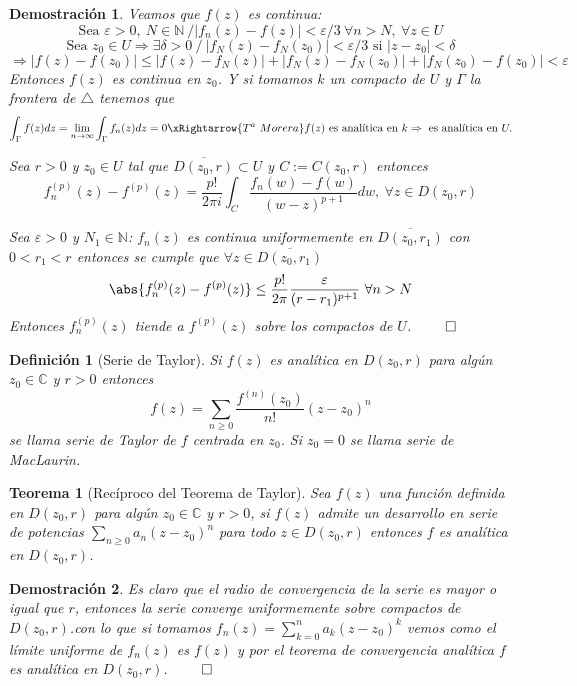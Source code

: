 \documentclass[12pt]{book}
\newtheorem{defi}{Definición}[chapter]
\newtheorem{theorem}{Teorema}[chapter]
\newtheorem*{dem}{Demostración}
\newcommand{\C}{\mathbb{C}}
\newcommand{\N}{\mathbb{N}}
\begin{document}
\begin{dem}
Veamos que $f(z)$ es continua:
$$\text{Sea } \varepsilon >0,\ N \in \N\ / |f_n(z)-f(z)| < \varepsilon/3\ \forall n> N,\ \forall z\in U$$
$$\text{Sea } z_0 \in U \Rightarrow \exists \delta >0\ /\ |f_N(z)-f_N(z_0)|<\varepsilon/3 \text{ si }|z-z_0|<\delta$$
$$ \Rightarrow |f(z)-f(z_0)| \leq |f(z)-f_N(z)|+|f_N(z)-f_N(z_0)|+|f_N(z_0)-f(z_0)|<\varepsilon$$
Entonces $f(z)$ es continua en $z_0$. Y si tomamos $k$ un compacto de $U$ y $\Gamma$ la frontera de $\triangle$ tenemos que
$$\int_\Gamma f(z)dz = \lim_{n\to \infty}\int_\Gamma f_n(z)dz = 0 \xRightarrow{T^a\ Morera} f(z) \text{ es analítica en } k\Rightarrow \text{ es analítica en } U.$$

Sea $r>0$ y $z_0\in U$ tal que $\overline{D(z_0,r)}\subset U$ y $C := C(z_0,r)$ entonces
$$f_n^{(p)}(z) - f^{(p)}(z) = \frac{p!}{2\pi i}\int_C \frac{f_n(w)-f(w)}{(w-z)^{p+1}}dw,\ \forall z\in D(z_0,r)$$

Sea $\varepsilon >0$ y $N_1 \in \N$: $f_n(z)$ es continua uniformemente en $\overline{D(z_0,r_1)}$ con $0<r_1<r$ entonces  se cumple que $\forall z \in\overline{D(z_0,r_1)}$
$$\abs{f_n^{(p)}(z) - f^{(p)}(z)} \leq \frac{p!}{2\pi}\frac{\varepsilon}{(r-r_1)^{p+1}}\ \forall n>N$$
Entonces $f_n^{(p)}(z)$ tiende a $f^{(p)}(z)$ sobre los compactos de $U$. $\qed$
\end{dem}

\begin{defi}[Serie de Taylor]
Si $f(z)$ es analítica en $D(z_0,r)$ para algún $z_0\in\C$ y $r>0$ entonces
$$f(z) = \sum_{n\geq 0} \frac{f^{(n)}(z_0)}{n!}(z-z_0)^n$$
se llama serie de Taylor de $f$ centrada en $z_0$. Si $z_0=0$ se llama serie de MacLaurin. 
\end{defi}


\begin{theorem}[Recíproco del Teorema de Taylor]
Sea $f(z)$ una función definida en $D(z_0,r)$ para algún $z_0\in \C$ y $r>0$, si $f(z)$ admite un desarrollo en serie de potencias $\sum_{n\geq 0} a_n(z-z_0)^n$ para todo $z\in D(z_0,r)$ entonces $f$ es analítica en $D(z_0,r)$.
\end{theorem}

\begin{dem}
Es claro que el radio de convergencia de la serie es mayor o igual que $r$, entonces la serie converge uniformemente sobre compactos de $D(z_0,r)$.con lo que si tomamos $f_n(z) = \sum_{k= 0}^n a_k(z-z_0)^k$ vemos como el límite uniforme de $f_n(z)$ es $f(z)$ y por el teorema de convergencia analítica $f$ es analítica en $D(z_0,r)$. $\qed$
\end{dem}
\end{document}
